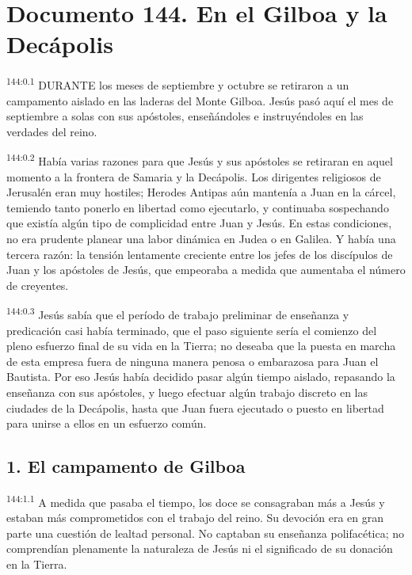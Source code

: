 \chapter{Documento 144. En el Gilboa y la Decápolis}
\par 
\textsuperscript{144:0.1} DURANTE los meses de septiembre y octubre se retiraron a un campamento aislado en las laderas del Monte Gilboa. Jesús pasó aquí el mes de septiembre a solas con sus apóstoles, enseñándoles e instruyéndoles en las verdades del reino.

\par 
\textsuperscript{144:0.2} Había varias razones para que Jesús y sus apóstoles se retiraran en aquel momento a la frontera de Samaria y la Decápolis. Los dirigentes religiosos de Jerusalén eran muy hostiles; Herodes Antipas aún mantenía a Juan en la cárcel, temiendo tanto ponerlo en libertad como ejecutarlo, y continuaba sospechando que existía algún tipo de complicidad entre Juan y Jesús. En estas condiciones, no era prudente planear una labor dinámica en Judea o en Galilea. Y había una tercera razón: la tensión lentamente creciente entre los jefes de los discípulos de Juan y los apóstoles de Jesús, que empeoraba a medida que aumentaba el número de creyentes.

\par 
\textsuperscript{144:0.3} Jesús sabía que el período de trabajo preliminar de enseñanza y predicación casi había terminado, que el paso siguiente sería el comienzo del pleno esfuerzo final de su vida en la Tierra; no deseaba que la puesta en marcha de esta empresa fuera de ninguna manera penosa o embarazosa para Juan el Bautista. Por eso Jesús había decidido pasar algún tiempo aislado, repasando la enseñanza con sus apóstoles, y luego efectuar algún trabajo discreto en las ciudades de la Decápolis, hasta que Juan fuera ejecutado o puesto en libertad para unirse a ellos en un esfuerzo común.

\section*{1. El campamento de Gilboa}
\par 
\textsuperscript{144:1.1} A medida que pasaba el tiempo, los doce se consagraban más a Jesús y estaban más comprometidos con el trabajo del reino. Su devoción era en gran parte una cuestión de lealtad personal. No captaban su enseñanza polifacética; no comprendían plenamente la naturaleza de Jesús ni el significado de su donación en la Tierra.

